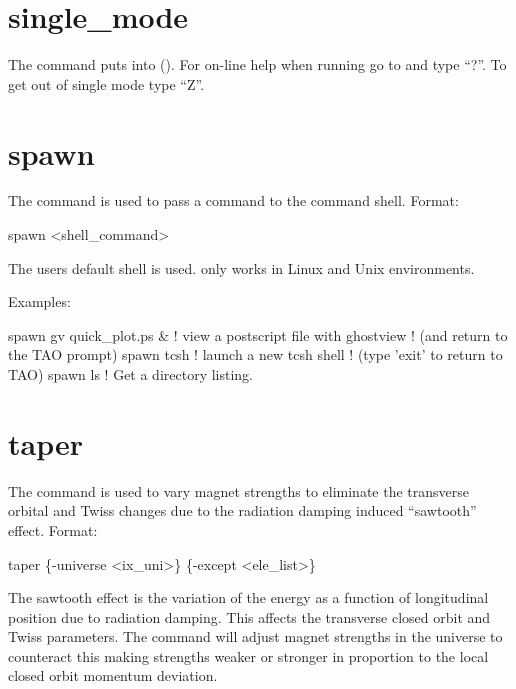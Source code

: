 {{{{{{{{{{\section{single_mode}
\label{s:sing}

The  command puts \tao into  ().  For on-line help
when running \tao go to  and type ``?''.  To get out of single mode type ``Z''.

\section{spawn}
\label{s:spawn}

The  command is used to pass a command to the command shell. Format:
\begin{example}
  spawn <shell_command>
\end{example}

The users default shell is used.  only works in Linux and Unix environments.

Examples:
\begin{example}
  spawn gv quick_plot.ps &      ! view a postscript file with ghostview
                                ! (and return to the TAO prompt)
  spawn tcsh                    ! launch a new tcsh shell 
                                ! (type 'exit' to return to TAO)
  spawn ls                      ! Get a directory listing.
\end{example}


\section{taper}
\label{s:taper}

The  command is used to vary magnet strengths to eliminate the transverse orbital and Twiss
changes due to the radiation damping induced ``sawtooth'' effect. Format:
\begin{example}
  taper \{-universe <ix_uni>\} \{-except <ele_list>\}
\end{example}

The sawtooth effect is the variation of the energy as a function of longitudinal position due to
radiation damping. This affects the transverse closed orbit and Twiss parameters. The 
command will adjust magnet strengths in the  universe to counteract this making strengths
weaker or stronger in proportion to the local closed orbit momentum deviation.

}}}}}}}}}}
